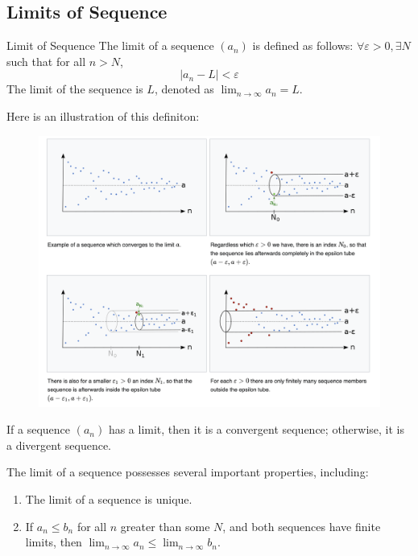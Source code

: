 \documentclass{article}
\begin{document}
\subsection{Limits of Sequence}
\begin{definition}{Limit of Sequence}
The limit of a sequence $(a_n)$ is defined as follows: $\forall \varepsilon > 0, \exists N$ such that for all $n > N$,
\begin{equation*}
|a_n - L| < \varepsilon
\end{equation*}
The limit of the sequence is $L$, denoted as $\lim_{n\to \infty}a_n = L$.
\end{definition}
Here is an illustration of this definiton:
\begin{figure}[h]
	\centering
	\includegraphics[scale=0.35]{img/seqlimit.png}
\end{figure}


If a sequence $(a_n)$ has a limit, then it is a convergent sequence; otherwise, it is a divergent sequence.

\begin{theorem}
The limit of a sequence possesses several important properties, including:
\begin{enumerate}
\item The limit of a sequence is unique.
\item If $a_n \leq b_n$ for all $n$ greater than some $N$, and both sequences have finite limits, then $\lim_{n\to \infty}a_n \leq \lim_{n\to \infty}b_n$.
\end{enumerate}
\end{theorem}
\end{document}

